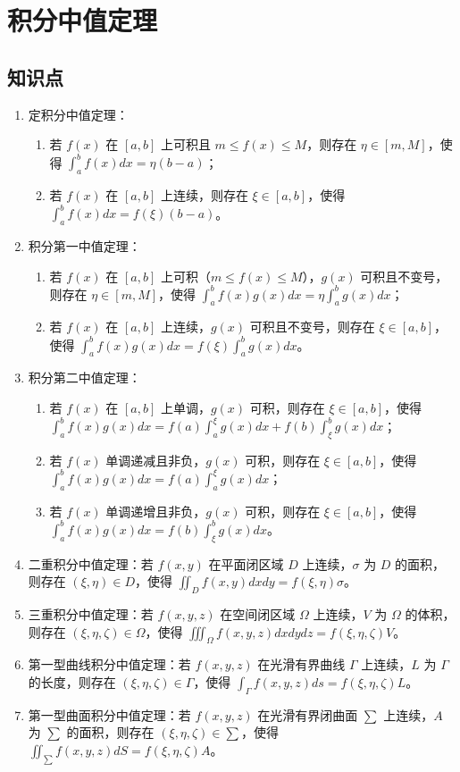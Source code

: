 \documentclass[UTF8]{ctexart}
\theoremstyle{remark}
\begin{document}
\section{积分中值定理}
\subsection*{知识点}
\begin{enumerate}
	\item 定积分中值定理：
	\begin{enumerate}
		\item 若 \(f(x)\) 在 \([a, b]\) 上可积且 \(m \leq f(x) \leq M\)，则存在 \(\eta \in [m, M]\)，使得 \(\int_{a}^{b} f(x) dx = \eta(b - a)\)；
		\item 若 \(f(x)\) 在 \([a, b]\) 上连续，则存在 \(\xi \in [a, b]\)，使得 \(\int_{a}^{b} f(x) dx = f(\xi)(b - a)\)。
	\end{enumerate}
	\item 积分第一中值定理：
	\begin{enumerate}
		\item 若 \(f(x)\) 在 \([a, b]\) 上可积（\(m \leq f(x) \leq M\)），\(g(x)\) 可积且不变号，则存在 \(\eta \in [m, M]\)，使得 \(\int_{a}^{b} f(x)g(x) dx = \eta \int_{a}^{b} g(x) dx\)；
		\item 若 \(f(x)\) 在 \([a, b]\) 上连续，\(g(x)\) 可积且不变号，则存在 \(\xi \in [a, b]\)，使得 \(\int_{a}^{b} f(x)g(x) dx = f(\xi) \int_{a}^{b} g(x) dx\)。
	\end{enumerate}
	\item 积分第二中值定理：
	\begin{enumerate}
		\item 若 \(f(x)\) 在 \([a, b]\) 上单调，\(g(x)\) 可积，则存在 \(\xi \in [a, b]\)，使得 \(\int_{a}^{b} f(x)g(x) dx = f(a)\int_{a}^{\xi} g(x) dx + f(b)\int_{\xi}^{b} g(x) dx\)；
		\item 若 \(f(x)\) 单调递减且非负，\(g(x)\) 可积，则存在 \(\xi \in [a, b]\)，使得 \(\int_{a}^{b} f(x)g(x) dx = f(a)\int_{a}^{\xi} g(x) dx\)；
		\item 若 \(f(x)\) 单调递增且非负，\(g(x)\) 可积，则存在 \(\xi \in [a, b]\)，使得 \(\int_{a}^{b} f(x)g(x) dx = f(b)\int_{\xi}^{b} g(x) dx\)。
	\end{enumerate}
	\item 二重积分中值定理：若 \(f(x, y)\) 在平面闭区域 \(D\) 上连续，\(\sigma\) 为 \(D\) 的面积，则存在 \((\xi, \eta) \in D\)，使得 \(\iint_{D} f(x, y) dxdy = f(\xi, \eta)\sigma\)。
	\item 三重积分中值定理：若 \(f(x, y, z)\) 在空间闭区域 \(\Omega\) 上连续，\(V\) 为 \(\Omega\) 的体积，则存在 \((\xi, \eta, \zeta) \in \Omega\)，使得 \(\iiint_{\Omega} f(x, y, z) dxdydz = f(\xi, \eta, \zeta)V\)。
	\item 第一型曲线积分中值定理：若 \(f(x, y, z)\) 在光滑有界曲线 \(\Gamma\) 上连续，\(L\) 为 \(\Gamma\) 的长度，则存在 \((\xi, \eta, \zeta) \in \Gamma\)，使得 \(\int_{\Gamma} f(x, y, z) ds = f(\xi, \eta, \zeta)L\)。
	\item 第一型曲面积分中值定理：若 \(f(x, y, z)\) 在光滑有界闭曲面 \(\sum\) 上连续，\(A\) 为 \(\sum\) 的面积，则存在 \((\xi, \eta, \zeta) \in \sum\)，使得 \(\iint_{\sum} f(x, y, z) dS = f(\xi, \eta, \zeta)A\)。
\end{enumerate}
\end{document}
